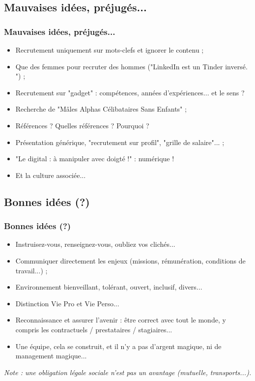 \documentclass[slidetop,11pt]{beamer}
\begin{document}
\subsection{Mauvaises id{\'e}es, pr{\'e}jug{\'e}s...}
\begin{frame}
	\frametitle{Mauvaises id{\'e}es, pr{\'e}jug{\'e}s...}
	\begin{itemize}
		\item Recrutement uniquement sur mots-clefs et ignorer le contenu ; 
		\item Que des femmes pour recruter des hommes ("LinkedIn est un Tinder invers{\'e}. ") ; 
		\item Recrutement sur "gadget" : comp{\'e}tences, ann{\'e}es d'exp{\'e}riences... et le sens ?
		\item Recherche de "M{\^a}les Alphas C{\'e}libataires Sans Enfants" ; 
		\item R{\'e}f{\'e}rences ? Quelles r{\'e}f{\'e}rences ? Pourquoi ?
		\item Pr{\'e}sentation g{\'e}n{\'e}rique, "recrutement sur profil", "grille de salaire"... ; 
		\item "Le digital : {\`a} manipuler avec doigt{\'e} !" : num{\'e}rique !
		\item Et la culture associ{\'e}e... 
	\end{itemize}
\end{frame}

\subsection{Bonnes id{\'e}es (?)}
\begin{frame}
	\frametitle{Bonnes id{\'e}es (?)}
	\begin{itemize}
		\item Instruisez-vous, renseignez-vous, oubliez vos clich{\'e}s...
		\item Communiquer directement les enjeux (missions, r{\'e}mun{\'e}ration, conditions de travail...) ;
		\item Environnement bienveillant, tol{\'e}rant, ouvert, inclusif, divers...
		\item Distinction Vie Pro et Vie Perso...
		\item Reconnaissance et assurer l'avenir : {\^e}tre correct avec tout le monde, y compris les contractuels / prestataires / stagiaires...
		\item Une {\'e}quipe, cela se construit, et il n'y a pas d'argent magique, ni de management magique...
	\end{itemize}
	
	\emph{Note : une obligation l{\'e}gale sociale n'est pas un avantage (mutuelle, transports...). } 
\end{frame}
\end{document}
